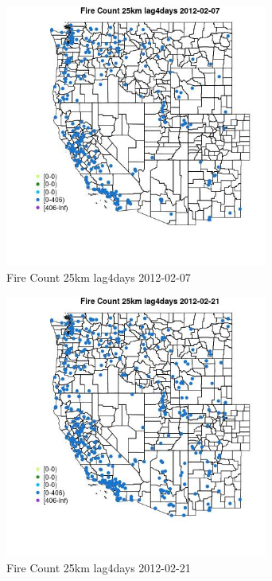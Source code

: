 \begin{figure} 
\centering  
\includegraphics[width=0.77\textwidth]{Code_Outputs/Report_ML_input_PM25_Step4_part_f_de_duplicated_aves_prioritize_24hr_obswNAs_MapObsFire_Count_25km_lag4days2012-02-07.jpg} 
\caption{\label{fig:Report_ML_input_PM25_Step4_part_f_de_duplicated_aves_prioritize_24hr_obswNAsMapObsFire_Count_25km_lag4days2012-02-07}Fire Count 25km lag4days 2012-02-07} 
\end{figure} 
 

\begin{figure} 
\centering  
\includegraphics[width=0.77\textwidth]{Code_Outputs/Report_ML_input_PM25_Step4_part_f_de_duplicated_aves_prioritize_24hr_obswNAs_MapObsFire_Count_25km_lag4days2012-02-21.jpg} 
\caption{\label{fig:Report_ML_input_PM25_Step4_part_f_de_duplicated_aves_prioritize_24hr_obswNAsMapObsFire_Count_25km_lag4days2012-02-21}Fire Count 25km lag4days 2012-02-21} 
\end{figure} 
 

